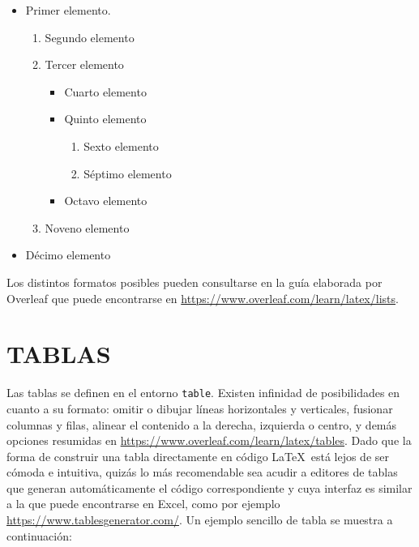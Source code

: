 \documentclass[a4paper, 11pt, spanish, twoside]{article}
\begin{document}
\begin{itemize}
    \item Primer elemento.
    \begin{enumerate}
        \item Segundo elemento
        \item Tercer elemento
        \begin{itemize}
            \item Cuarto elemento
            \item Quinto elemento
            \begin{enumerate}
                \item Sexto elemento
                \item Séptimo elemento
            \end{enumerate}
            \item Octavo elemento
        \end{itemize}
        \item Noveno elemento
    \end{enumerate}
    \item Décimo elemento
\end{itemize}

Los distintos formatos posibles pueden consultarse en la guía elaborada por Overleaf que puede encontrarse en \url{https://www.overleaf.com/learn/latex/lists}.




\newpage
\section{TABLAS} \label{sec:tablas}

Las tablas se definen en el entorno \texttt{table}. Existen infinidad de posibilidades en cuanto a su formato: omitir o dibujar líneas horizontales y verticales, fusionar columnas y filas, alinear el contenido a la derecha, izquierda o centro, y demás opciones resumidas en \url{https://www.overleaf.com/learn/latex/tables}. Dado que la forma de construir una tabla directamente en código \LaTeX \ está lejos de ser cómoda e intuitiva, quizás lo más recomendable sea acudir a editores de tablas que generan automáticamente el código correspondiente y cuya interfaz es similar a la que puede encontrarse en Excel, como por ejemplo \url{https://www.tablesgenerator.com/}. Un ejemplo sencillo de tabla se muestra a continuación:
\end{document}
